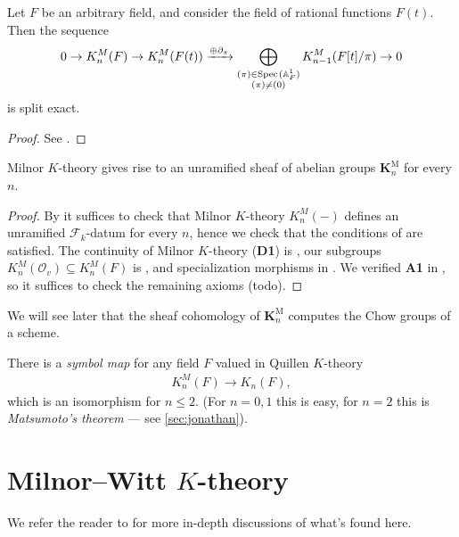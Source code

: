 \documentclass[11pt,openany]{book}
\let\del\partial
\providecommand{\KM}{\mathbf{K}^\mathrm{M}}
\begin{document}
\begin{theorem} Let $F$ be an arbitrary field, and consider the field of rational functions $F(t)$. Then the sequence
\begin{align*}
    0 \to K_n^M(F) \to K_n^M(F(t)) \xto{\oplus\del_\pi} \bigoplus_{\substack{(\pi)\in \Spec(\A^1_F) \\ (\pi)\ne (0)}} K_{n-1}^M(F[t]/\pi) \to 0
\end{align*}
is split exact.
\end{theorem}
\begin{proof} See \cite[pp.~325-327]{MilnorK}.
\end{proof}


\begin{proposition}\label{prop:KM-is-an-unramified-sheaf} 
Milnor $K$-theory gives rise to an unramified sheaf of abelian groups $\KM_n$ for every $n$.
\end{proposition}
\begin{proof} By  it suffices to check that Milnor $K$-theory $K_n^M(-)$ defines an unramified $\mathcal{F}_k$-datum for every $n$, hence we check that the conditions of  are satisfied. The continuity of Milnor $K$-theory (\textbf{D1}) is , our subgroups $K_n^M(\mathcal{O}_v) \subseteq K_n^M(F)$ is , and specialization morphisms in . We verified \textbf{A1} in , so it suffices to check the remaining axioms (todo).
\end{proof}


We will see later that the sheaf cohomology of $\KM_n$ computes the Chow groups of a scheme.

\begin{proposition}\label{prop:symbol_map} There is a \textit{symbol map} for any field $F$ valued in Quillen $K$-theory
\begin{align*}
    K_n^M(F) \to K_n(F),
\end{align*}
which is an isomorphism for $n\le 2$. (For $n=0,1$ this is easy, for $n=2$ this is \textit{Matsumoto's theorem} --- see \autoref{sec:jonathan}).
\end{proposition}

\section{Milnor--Witt \texorpdfstring{$K$}{K}-theory} We refer the reader to \cite{Deglise-KMW,Carlier} for more in-depth discussions of what's found here.
\end{document}
